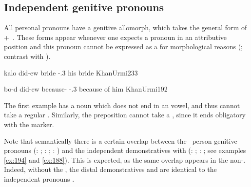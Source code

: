 









\largerpage

\subsection{Independent genitive pronouns} \label{ss:JUrm_ind_gen}

All personal pronouns have a genitive allomorph, which takes the general form of  +\poss\ \citep[58]{KhanUrmi}. These forms appear whenever one expects a pronoun in an attributive position and this pronoun cannot be expressed as a  for morphological reasons (\cite[233]{KhanUrmi}; contrast with ). 

{kalo did-ew}
{bride \gen-\poss.3\masc}
{his bride}
{KhanUrmi}{233}

{bo-d\cb{} did-ew}
{because-\cst\cb{} \gen-\poss.3\masc}
{because of him}
{KhanUrmi}{192}



The first example has a \prim noun  which does not end in an  vowel, and thus cannot take a regular . Similarly, the preposition  cannot take a , since it ends obligatory with the \cst* marker.













Note that semantically there is a certain overlap between the \third\ person genitive pronouns (\masc: ; \fem: ; \pl: ) and the independent demonstratives with  (\sg: ; \pl: ; see examples \ref{ex:194} and \vref{ex:188}). This is expected, as the same overlap appears in the non-. Indeed, without the , the distal demonstratives  and  are identical to the independent pronouns \citep[55--56]{KhanUrmi}. 

